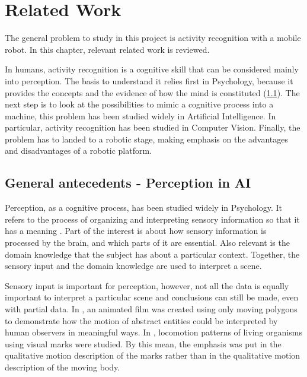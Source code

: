 \chapter{Related Work}

The general problem to study in this project is activity recognition with a mobile robot. 
In this chapter, relevant related work is reviewed.

In humans, activity recognition is a cognitive skill that can be considered mainly into perception. 
The basis to understand it relies first in Psychology, because it provides the concepts and the evidence of how the mind is constituted (\ref{ch_LitRev_Perception}). 
The next step is to look at the possibilities to mimic a cognitive process into a machine, this problem has been studied widely in Artificial Intelligence. %
In particular, activity recognition has been studied in Computer Vision. %
Finally, the problem has to landed to a robotic stage, making emphasis on the advantages and disadvantages of a robotic platform. %


\section{General antecedents - Perception in AI} \label{ch_LitRev_Perception}

Perception, as a cognitive process, has been studied widely in Psychology.
It refers to the process of organizing and interpreting sensory information so that it has a meaning \citep{King2014Psychology}.
Part of the interest is about how sensory information is processed by the brain, and which parts of it are essential.
Also relevant is the domain knowledge that the subject has about a particular context.
Together, the sensory input and the domain knowledge are used to interpret a scene.


Sensory input is important for perception, however, not all the data is equally important to interpret a particular scene and conclusions can still be made, even with partial data.
In \citep{Heider1944_Experimental}, an animated film was created using only moving polygons to demonstrate how the motion of abstract entities could be interpreted by human observers in meaningful ways.
In \citep{Johansson1973_VisualPer}, locomotion patterns of living organisms using visual marks were studied. 
By this mean, the emphasis was put in the qualitative motion description of the marks rather than in the qualitative motion description of the moving body.


